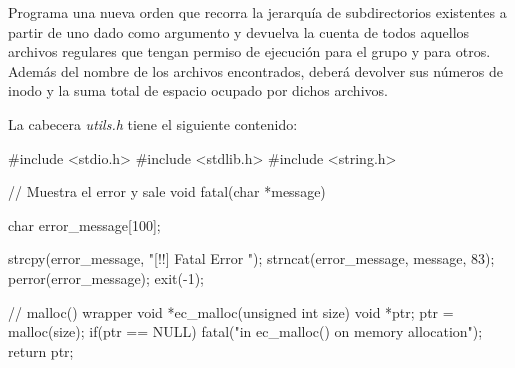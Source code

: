 \begin{exercise}
Programa una nueva orden que recorra la jerarquía de subdirectorios
existentes a partir de uno dado como argumento y devuelva la cuenta de todos aquellos
archivos regulares que tengan permiso de ejecución para el grupo y para otros. Además del
nombre de los archivos encontrados, deberá devolver sus números de inodo y la suma total de
espacio ocupado por dichos archivos.


\end{exercise}

La cabecera \emph{utils.h} tiene el siguiente contenido:

\begin{cppcode}
#include <stdio.h>
#include <stdlib.h>
#include <string.h>

// Muestra el error y sale
void fatal(char *message) {
   char error_message[100];

   strcpy(error_message, "[!!] Fatal Error ");
   strncat(error_message, message, 83);
   perror(error_message);
   exit(-1);
}

// malloc() wrapper
void *ec_malloc(unsigned int size) {
   void *ptr;
   ptr = malloc(size);
   if(ptr == NULL)
      fatal("in ec_malloc() on memory allocation");
   return ptr;
}
\end{cppcode}
